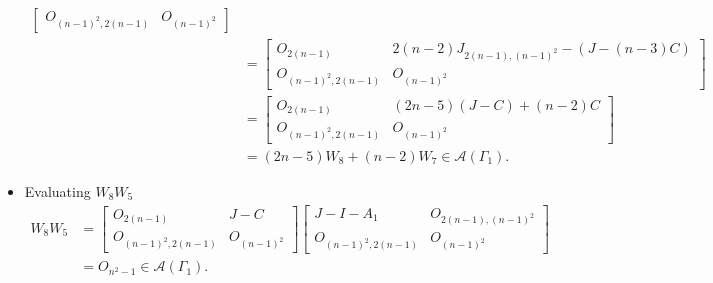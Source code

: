 \begin{itemize}
\begin{align*}
\begin{bmatrix}
            O_{(n-1)^2, 2(n-1)} & O_{(n-1)^2}
        \end{bmatrix}\\
        &=\begin{bmatrix}
            O_{2(n-1)} & 2(n-2)J_{2(n-1),(n-1)^2} -(J-(n-3)C) \\
            O_{(n-1)^2, 2(n-1)} & O_{(n-1)^2}
        \end{bmatrix}\\
        &= \begin{bmatrix}
            O_{2(n-1)} & (2n-5)(J-C) + (n-2)C \\
            O_{(n-1)^2, 2(n-1)} & O_{(n-1)^2}
        \end{bmatrix}\\
        &= (2n-5)W_8 + (n-2)W_7\in\mathcal{A}(\Gamma_1).
    \end{align*}
    
    \item Evaluating $W_8W_5$
    \begin{align*}
        W_8W_5
        &= \begin{bmatrix}
            O_{2(n-1)} & J-C \\
            O_{(n-1)^2, 2(n-1)} & O_{(n-1)^2}
        \end{bmatrix}\begin{bmatrix}
            J-I-A_1 & O_{2(n-1), (n-1)^2} \\
            O_{(n-1)^2, 2(n-1)} & O_{(n-1)^2}
        \end{bmatrix}\\
        &= O_{n^2-1}\in\mathcal{A}(\Gamma_1).
    \end{align*}
    

\end{itemize}

